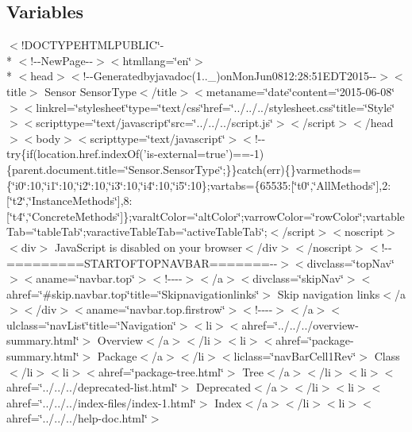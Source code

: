 \subsection*{Variables}
\begin{DoxyCompactItemize}
\item 
$<$!D\-O\-C\-T\-Y\-P\-E\-H\-T\-M\-L\-P\-U\-B\-L\-I\-C\char`\"{}-\/\\*
$<$!-\/-\/New\-Page-\/-\/$>$$<$htmllang=\char`\"{}en\char`\"{}$>$\\*
$<$head$>$$<$!-\/-\/Generatedbyjavadoc(1..\-\_)on\-Mon\-Jun0812\-:28\-:51\-E\-D\-T2015-\/-\/$>$$<$title$>$ Sensor Sensor\-Type$<$/title$>$$<$metaname=\char`\"{}date\char`\"{}content=\char`\"{}2015-\/06-\/08\char`\"{}$>$$<$linkrel=\char`\"{}stylesheet\char`\"{}type=\char`\"{}text/css\char`\"{}href=\char`\"{}../../../stylesheet.\-css\char`\"{}title=\char`\"{}\-Style\char`\"{}$>$$<$scripttype=\char`\"{}text/javascript\char`\"{}src=\char`\"{}../../../script.\-js\char`\"{}$>$$<$/script$>$$<$/head$>$$<$body$>$$<$scripttype=\char`\"{}text/javascript\char`\"{}$>$$<$!-\/-\/try\{if(location.\-href.\-index\-Of('is-\/external=true')==-\/1)\{parent.\-document.\-title=\char`\"{}\-Sensor.\-Sensor\-Type\char`\"{};\}\}catch(err)\{\}varmethods=\{\char`\"{}i0\char`\"{}\-:10,\char`\"{}i1\char`\"{}\-:10,\char`\"{}i2\char`\"{}\-:10,\char`\"{}i3\char`\"{}\-:10,\char`\"{}i4\char`\"{}\-:10,\char`\"{}i5\char`\"{}\-:10\};vartabs=\{65535\-:\mbox{[}\char`\"{}t0\char`\"{},\char`\"{}\-All\-Methods\char`\"{}\mbox{]},2\-:\mbox{[}\char`\"{}t2\char`\"{},\char`\"{}\-Instance\-Methods\char`\"{}\mbox{]},8\-:\mbox{[}\char`\"{}t4\char`\"{},\char`\"{}\-Concrete\-Methods\char`\"{}\mbox{]}\};varalt\-Color=\char`\"{}alt\-Color\char`\"{};varrow\-Color=\char`\"{}row\-Color\char`\"{};vartable\-Tab=\char`\"{}table\-Tab\char`\"{};varactive\-Table\-Tab=\char`\"{}active\-Table\-Tab\char`\"{};$<$/script$>$$<$noscript$>$$<$div$>$ Java\-Script is disabled on your browser$<$/div$>$$<$/noscript$>$$<$!-\/-\/=========\-S\-T\-A\-R\-T\-O\-F\-T\-O\-P\-N\-A\-V\-B\-A\-R=======-\/-\/$>$$<$divclass=\char`\"{}top\-Nav\char`\"{}$>$$<$aname=\char`\"{}navbar.\-top\char`\"{}$>$$<$!-\/-\/-\/-\/$>$$<$/a$>$$<$divclass=\char`\"{}skip\-Nav\char`\"{}$>$$<$ahref=\char`\"{}\#skip.\-navbar.\-top\char`\"{}title=\char`\"{}\-Skipnavigationlinks\char`\"{}$>$ Skip navigation links$<$/a$>$$<$/div$>$$<$aname=\char`\"{}navbar.\-top.\-firstrow\char`\"{}$>$$<$!-\/-\/-\/-\/$>$$<$/a$>$$<$ulclass=\char`\"{}nav\-List\char`\"{}title=\char`\"{}\-Navigation\char`\"{}$>$$<$li$>$$<$ahref=\char`\"{}../../../overview-\/summary.\-html\char`\"{}$>$ Overview$<$/a$>$$<$/li$>$$<$li$>$$<$ahref=\char`\"{}package-\/summary.\-html\char`\"{}$>$ Package$<$/a$>$$<$/li$>$$<$liclass=\char`\"{}nav\-Bar\-Cell1\-Rev\char`\"{}$>$ Class$<$/li$>$$<$li$>$$<$ahref=\char`\"{}package-\/tree.\-html\char`\"{}$>$ Tree$<$/a$>$$<$/li$>$$<$li$>$$<$ahref=\char`\"{}../../../deprecated-\/list.\-html\char`\"{}$>$ Deprecated$<$/a$>$$<$/li$>$$<$li$>$$<$ahref=\char`\"{}../../../index-\/files/index-\/1.\-html\char`\"{}$>$ Index$<$/a$>$$<$/li$>$$<$li$>$$<$ahref=\char`\"{}../../../help-\/doc.\-html\char`\"{}$>$ $$
\end{DoxyCompactItemize}
